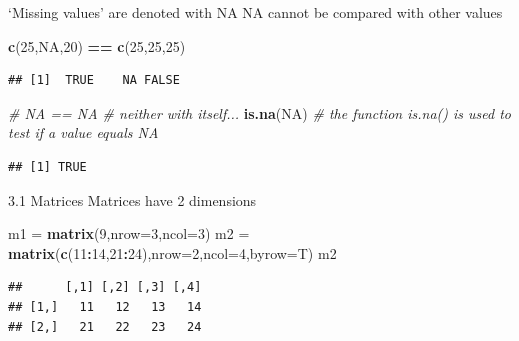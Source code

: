 \documentclass[
  ignorenonframetext,
]{beamer}
\newenvironment{Shaded}{\begin{snugshade}}{\end{snugshade}}
\newcommand{\AttributeTok}[1]{\textcolor[rgb]{0.13,0.29,0.53}{#1}}
\newcommand{\CommentTok}[1]{\textcolor[rgb]{0.56,0.35,0.01}{\textit{#1}}}
\newcommand{\ConstantTok}[1]{\textcolor[rgb]{0.56,0.35,0.01}{#1}}
\newcommand{\DecValTok}[1]{\textcolor[rgb]{0.00,0.00,0.81}{#1}}
\newcommand{\FunctionTok}[1]{\textcolor[rgb]{0.13,0.29,0.53}{\textbf{#1}}}
\newcommand{\NormalTok}[1]{#1}
\newcommand{\OtherTok}[1]{\textcolor[rgb]{0.56,0.35,0.01}{#1}}
\newcommand{\SpecialCharTok}[1]{\textcolor[rgb]{0.81,0.36,0.00}{\textbf{#1}}}
\begin{document}
\begin{frame}[fragile]
`Missing values' are denoted with NA NA cannot be compared with other
values

\begin{Shaded}
\begin{Highlighting}[]
\FunctionTok{c}\NormalTok{(}\DecValTok{25}\NormalTok{,}\ConstantTok{NA}\NormalTok{,}\DecValTok{20}\NormalTok{) }\SpecialCharTok{==} \FunctionTok{c}\NormalTok{(}\DecValTok{25}\NormalTok{,}\DecValTok{25}\NormalTok{,}\DecValTok{25}\NormalTok{)}
\end{Highlighting}
\end{Shaded}

\begin{verbatim}
## [1]  TRUE    NA FALSE
\end{verbatim}

\begin{Shaded}
\begin{Highlighting}[]
\CommentTok{\# NA == NA \# neither with itself...}
\FunctionTok{is.na}\NormalTok{(}\ConstantTok{NA}\NormalTok{) }\CommentTok{\# the function is.na() is used to test if a value equals NA}
\end{Highlighting}
\end{Shaded}

\begin{verbatim}
## [1] TRUE
\end{verbatim}
\end{frame}

\begin{frame}[fragile]{3.1 Matrices}
\protect\hypertarget{matrices}{}
Matrices have 2 dimensions

\begin{Shaded}
\begin{Highlighting}[]
\NormalTok{m1 }\OtherTok{=} \FunctionTok{matrix}\NormalTok{(}\DecValTok{9}\NormalTok{,}\AttributeTok{nrow=}\DecValTok{3}\NormalTok{,}\AttributeTok{ncol=}\DecValTok{3}\NormalTok{)}
\NormalTok{m2 }\OtherTok{=} \FunctionTok{matrix}\NormalTok{(}\FunctionTok{c}\NormalTok{(}\DecValTok{11}\SpecialCharTok{:}\DecValTok{14}\NormalTok{,}\DecValTok{21}\SpecialCharTok{:}\DecValTok{24}\NormalTok{),}\AttributeTok{nrow=}\DecValTok{2}\NormalTok{,}\AttributeTok{ncol=}\DecValTok{4}\NormalTok{,}\AttributeTok{byrow=}\NormalTok{T)}
\NormalTok{m2}
\end{Highlighting}
\end{Shaded}

\begin{verbatim}
##      [,1] [,2] [,3] [,4]
## [1,]   11   12   13   14
## [2,]   21   22   23   24
\end{verbatim}
\end{frame}
\end{document}
